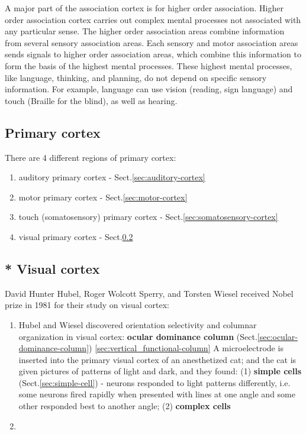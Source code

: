 A major part of the association cortex is for higher order association.
Higher order association cortex carries out complex mental processes not
associated with any particular sense.
The higher order association areas combine information from several sensory
association areas. Each sensory and motor association areas sends signals to
higher order association areas, which combine this information to form the basis
of the highest mental processes.
These highest mental processes, like language, thinking, and planning, do not
depend on specific sensory information.
For example, language can use vision (reading, sign language) and touch (Braille
for the blind), as well as hearing.

\subsection{Primary cortex}
\label{sec:primary-cortex}


There are 4 different regions of primary cortex:
\begin{enumerate}
  \item auditory primary cortex - Sect.\ref{sec:auditory-cortex}
  \item motor primary cortex - Sect.\ref{sec:motor-cortex}
  \item touch (somatosensory) primary cortex - Sect.\ref{sec:somatosensory-cortex}
  \item visual primary cortex - Sect.\ref{sec:visual-cortex}
\end{enumerate}

\subsection{* Visual cortex}
\label{sec:visual-cortex}

David Hunter Hubel, Roger Wolcott Sperry, and Torsten Wiesel received Nobel
prize in 1981 for their study on visual cortex:
\begin{enumerate}
  \item Hubel and Wiesel discovered orientation selectivity and columnar
  organization in visual cortex: {\bf ocular dominance column}
  (Sect.\ref{sec:ocular-dominance-column})
\ref{sec:vertical_functional-column}
A microelectrode is inserted into the primary visual cortex of an anesthetized
cat; and the cat is given pictures of patterns of light and dark, and they
found: (1) {\bf simple cells} (Sect.\ref{sec:simple-cell}) - neurons responded
to light patterns differently, i.e. some neurons fired rapidly when presented
with lines at one angle and some other responded best to another angle; (2) {\bf
complex cells}
 
   
  \item 
\end{enumerate}


